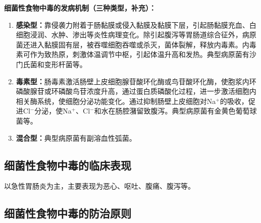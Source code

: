 \begin{tipbox}
\textbf{细菌性食物中毒的发病机制（三种类型，补充）：}
\begin{enumerate}[leftmargin=*]
    \item \textbf{感染型：}靠侵袭力附着于肠黏膜或侵入黏膜及黏膜下层，引起肠黏膜充血、白细胞浸润、水肿、渗出等炎性病理变化。除引起腹泻等胃肠道综合征外，病原菌还进入黏膜固有层，被吞噬细胞吞噬或杀灭，菌体裂解，释放内毒素。内毒素可作为致热原，刺激体温调节中枢，引起体温升高和发热。典型病原菌有沙门氏菌和变形杆菌等。
    \item \textbf{毒素型：}肠毒素激活肠壁上皮细胞腺苷酸环化酶或鸟苷酸环化酶，使胞浆内环磷酸腺苷或环磷酸鸟苷浓度升高，通过蛋白质磷酸化过程，进一步激活细胞内相关酶系统，使细胞分泌功能变化。通过抑制肠壁上皮细胞对Na$^+$的吸收，促进Cl$^-$分泌，使Na$^+$、Cl$^-$和水在肠腔潴留致腹泻。典型病原菌有金黄色葡萄球菌等。
    \item \textbf{混合型：}典型病原菌有副溶血性弧菌。
\end{enumerate}
\end{tipbox}

\subsection{细菌性食物中毒的临床表现}

以急性胃肠炎为主，主要表现为恶心、呕吐、腹痛、腹泻等。

\subsection{细菌性食物中毒的防治原则}

